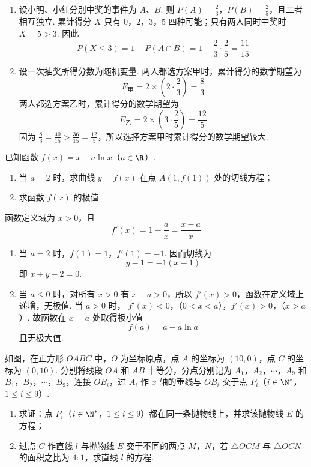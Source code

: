 \begin{solution}
\begin{enumerate}
\item 设小明、小红分别中奖的事件为 \(A\)、\(B\). 则 \(P(A)=\frac23\)，\(P(B)=\frac25\)，且二者相互独立. 累计得分 \(X\) 只有 \(0\)，\(2\)，\(3\)，\(5\) 四种可能；只有两人同时中奖时 \(X=5>3\). 因此
\[
P(X\leqslant3)=1-P(A\cap B)=1-\frac23\cdot\frac25=\frac{11}{15}
\]
\item 设一次抽奖所得分数为随机变量. 两人都选方案甲时，累计得分的数学期望为
\[
E_{\text{甲}}=2\times\left(2\cdot\frac23\right)=\frac83
\]
两人都选方案乙时，累计得分的数学期望为
\[
E_{\text{乙}}=2\times\left(3\cdot\frac25\right)=\frac{12}{5}
\]
因为 \(\frac83=\frac{40}{15}>\frac{36}{15}=\frac{12}{5}\)，所以选择方案甲时累计得分的数学期望较大.
\end{enumerate}
\end{solution}

\begin{problem}
已知函数 \(f(x) = x - a \ln x\)（\(a \in \R\)）.

\begin{enumerate}
\item 当 \(a = 2\) 时，求曲线 \(y = f(x)\) 在点 \(A(1, f(1))\) 处的切线方程；
\item 求函数 \(f(x)\) 的极值.
\end{enumerate}
\end{problem}

\begin{solution}
函数定义域为 \(x>0\)，且
\[
f'(x)=1-\frac ax=\frac{x-a}{x}
\]
\begin{enumerate}
\item 当 \(a=2\) 时，\(f(1)=1\)，\(f'(1)=-1\). 因而切线为
\[
y-1=-1(x-1)
\]
即 \(x+y-2=0\).
\item 当 \(a\leqslant0\) 时，对所有 \(x>0\) 有 \(x-a>0\)，所以 \(f'(x)>0\)，函数在定义域上递增，无极值. 当 \(a>0\) 时，
\(f'(x)<0\)，（\(0<x<a\)），\(f'(x)>0\)，（\(x>a\)）.
故函数在 \(x=a\) 处取得极小值
\[
f(a)=a-a\ln a
\]
且无极大值.
\end{enumerate}
\end{solution}

\begin{problem}
如图，在正方形 \(OABC\) 中，\(O\) 为坐标原点，点 \(A\) 的坐标为 \((10,0)\)，点 \(C\) 的坐标为 \((0,10)\). 分别将线段 \(OA\) 和 \(AB\) 十等分，分点分别记为 \(A_1\)，\(A_2\)，\(\cdots\)，\(A_9\) 和 \(B_1\)，\(B_2\)，\(\cdots\)，\(B_9\)，连接 \(OB_i\)，过 \(A_i\) 作 \(x\) 轴的垂线与 \(OB_i\) 交于点 \(P_i\)（\(i \in \N^{*}\)，\(1 \leqslant i \leqslant 9\)）.

\begin{enumerate}
\item 求证：点 \(P_i\)（\(i \in \N^{*}\)，\(1 \leqslant i \leqslant 9\)）都在同一条抛物线上，并求该抛物线 \(E\) 的方程；
\item 过点 \(C\) 作直线 \(l\) 与抛物线 \(E\) 交于不同的两点 \(M\)，\(N\)，若 \(\triangle OCM\) 与 \(\triangle OCN\) 的面积之比为 \(4 : 1\)，求直线 \(l\) 的方程.
\end{enumerate}

\end{problem}

